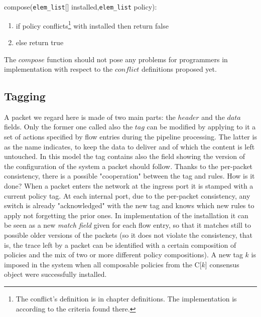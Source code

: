 \documentclass{article}
\theoremstyle{remark}
\begin{document}
compose(\texttt{elem\_list}[] installed,\texttt{elem\_list} policy):
\begin{enumerate}
\item if policy conflicts\footnote{The conflict's definition is in chapter definitions. The implementation is according to the criteria found there.} with installed then return false
\item else return true
\end{enumerate} 
The $compose$ function should not pose any problems for programmers in implementation with respect to the $conflict$ definitions proposed yet.
\subsection{Tagging}
A packet we regard here is made of two main parts: the $header$ and the $data$ fields. Only the former one called also the $tag$ can be modified by applying to it a set of actions specified by flow entries during the pipeline processing. The latter is as the name indicates, to keep the data to deliver and of which the content is left untouched.
In this model the tag contains also the field showing the version of the configuration of the system a packet should follow. Thanks to the per-packet consistency, there is a possible "cooperation" between the tag and rules.
How is it done? When a packet enters the network at the ingress port it is stamped with a current policy tag. At each internal port, due to the per-packet consistency, any switch is already "acknowledged" with the new tag and knows which new rules to apply not forgetting the prior ones. In implementation of the installation it can be seen as a new \emph{match field} given for each flow entry, so that it matches still to possible older versions of the packets (so it does not violate the consistency, that is, the trace left by a packet can be identified with a certain composition of policies and the mix of two or more different policy compositions). 
A new tag $k$ is imposed in the system when all composable policies from the C[$k$] consensus object were successfully installed.\\
\end{document}
